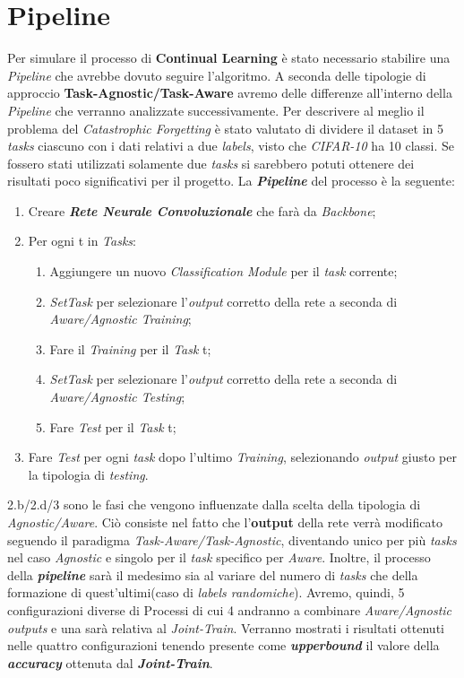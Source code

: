 \section{Pipeline}
Per simulare il processo di \textbf{Continual Learning} è stato necessario stabilire una \textit{Pipeline} che avrebbe dovuto seguire l'algoritmo. A seconda delle tipologie di approccio 
\textbf{Task-Agnostic/Task-Aware} avremo delle differenze all'interno della \textit{Pipeline} che verranno analizzate successivamente.
\newline
Per descrivere al meglio il problema del \textit{Catastrophic Forgetting} è stato valutato di dividere il dataset in 5 \textit{tasks} ciascuno con i dati relativi  a due \textit{labels}, visto che \textit{CIFAR-10} ha 10 classi. Se fossero stati utilizzati solamente due \textit{tasks} si sarebbero potuti ottenere dei risultati poco significativi per il progetto.
\newpage
La \textbf{\textit{Pipeline}} del processo è la seguente:
\begin{enumerate}
    \item Creare \textbf{\textit{Rete Neurale Convoluzionale}}  che farà da \textit{Backbone};
    \item Per ogni t in \textit{Tasks}:
    \begin{enumerate}
        \item Aggiungere un nuovo \textit{Classification Module} per il \textit{task} corrente;
        \item \textit{SetTask} per selezionare l'\textit{output} corretto della rete a seconda di  \textit{Aware/Agnostic Training}; 
        \item Fare il \textit{Training} per il \textit{Task} t;
        \item \textit{SetTask} per selezionare l'\textit{output} corretto della rete a seconda di  \textit{Aware/Agnostic Testing};
        \item Fare \textit{Test}  per il \textit{Task} t;
     \end{enumerate}
    \item Fare \textit{Test}  per ogni \textit{task} dopo l'ultimo \textit{Training}, selezionando \textit{output} giusto per la tipologia di \textit{testing}.
\end{enumerate}
2.b/2.d/3 sono le fasi che vengono influenzate dalla scelta della tipologia di \textit{Agnostic/Aware}. Ciò consiste nel fatto che l'\textbf{output} della rete verrà modificato seguendo il paradigma \textit{Task-Aware/Task-Agnostic}, diventando unico per più \textit{tasks} nel caso \textit{Agnostic} e singolo per il \textit{task} specifico per \textit{Aware}.\newline
Inoltre, il processo della \textbf{\textit{pipeline}} sarà il medesimo sia al variare del numero di \textit{tasks} che della formazione di quest'ultimi(caso di \textit{labels randomiche}).\newline
Avremo, quindi, 5 configurazioni diverse di Processi di cui 4 andranno a combinare \textit{Aware/Agnostic outputs} e una sarà relativa al \textit{Joint-Train}.\newline
Verranno mostrati i risultati ottenuti nelle quattro configurazioni tenendo presente come \textbf{\textit{upperbound}} il valore della \textbf{\textit{accuracy}} ottenuta dal \textbf{\textit{Joint-Train}}.
\newpage
